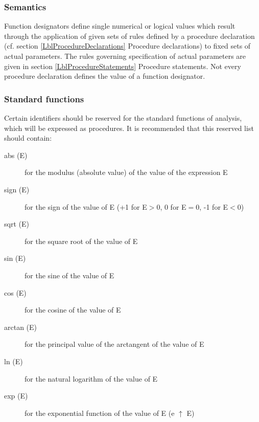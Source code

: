 \documentclass[a4paper,11pt]{article}
\begin{document}
\subsubsection{Semantics}
\label{LblFunctionDesignatorsSemantics}

Function designators define single numerical or logical values which
result through the application of given sets of rules defined by a
procedure declaration (cf. section \ref{LblProcedureDeclarations}
Procedure declarations) to fixed sets of actual parameters.  The rules
governing specification of actual parameters are given in section
\ref{LblProcedureStatements} Procedure statements.  Not every
procedure declaration defines the value of a function designator.

\subsubsection{Standard functions}
\label{LblStandardFunctions}

Certain identifiers should be reserved for the standard functions of
analysis, which will be expressed as procedures.  It is recommended
that this reserved list should contain:


\begin{description}

\item[abs (E)] for the modulus (absolute value) of the value of the
        expression E

\item[sign (E)] for the sign of the value of E (+1 for E$>$0, 0 for E$=$0,
        -1 for E$<$0)

\item[sqrt (E)] for the square root of the value of E

\item[sin (E)] for the sine of the value of E

\item[cos (E)] for the cosine of the value of E

\item[arctan (E)] for the principal value of the arctangent of the value
        of E

\item[ln (E)] for the natural logarithm of the value of E

\item[exp (E)] for the exponential function of the value
        of E (e $\uparrow$ E)
\end{description}
\end{document}
